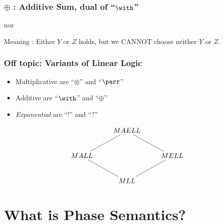 \documentclass[dvipdfmx,cjk]{beamer}
\theoremstyle{example}
\begin{document}
\begin{frame}
  \frametitle{$\oplus$ : Additive Sum, dual of ``$\with$''} 
  
  \begin{prooftree}

    
  \end{prooftree}

  nor

  \begin{prooftree}

    
  \end{prooftree} 

  Meaning : Either $Y$ or $Z$ holds, but we CANNOT choose neither $Y$ or $Z$.

\end{frame}

\begin{frame}
  \frametitle{Off topic: Variants of Linear Logic}

  \begin{itemize}
      \item Multiplicative are ``$\otimes$'' and ``$\parr$'' 
      \item Additive are ``$\with$''   and ``$\oplus$''
      \item \textit{Exponential} are ``$!$'' and ``$?$''
  \end{itemize}

  \[
      \xymatrix{
        & MAELL \ar@{-}[dr] \ar@{-}[dl] \\
        MALL \ar@{-}[dr] & & MELL \ar@{-}[dl] \\
        & MLL
      }
   \]      
  
\end{frame}

                          \section{What is Phase Semantics?}
                          
\end{document}
